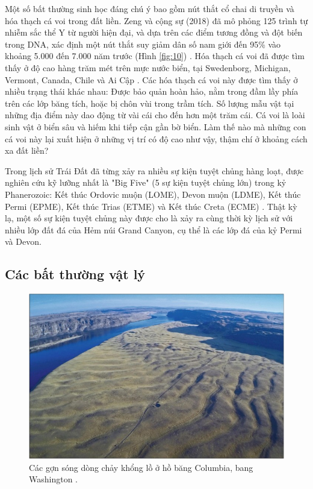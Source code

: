 \documentclass[10pt,twocolumn,letterpaper]{article}
\begin{document}
Một số bất thường sinh học đáng chú ý bao gồm nút thắt cổ chai di truyền và hóa thạch cá voi trong đất liền. Zeng và cộng sự (2018) đã mô phỏng 125 trình tự nhiễm sắc thể Y từ người hiện đại, và dựa trên các điểm tương đồng và đột biến trong DNA, xác định một nút thắt suy giảm dân số nam giới đến 95\% vào khoảng 5.000 đến 7.000 năm trước (Hình \ref{fig:10}) \cite{62}. Hóa thạch cá voi đã được tìm thấy ở độ cao hàng trăm mét trên mực nước biển, tại Swedenborg, Michigan, Vermont, Canada, Chile và Ai Cập \cite{63,64,65,66}. Các hóa thạch cá voi này được tìm thấy ở nhiều trạng thái khác nhau: Được bảo quản hoàn hảo, nằm trong đầm lầy phía trên các lớp băng tích, hoặc bị chôn vùi trong trầm tích. Số lượng mẫu vật tại những địa điểm này dao động từ vài cái cho đến hơn một trăm cái. Cá voi là loài sinh vật ở biển sâu và hiếm khi tiếp cận gần bờ biển. Làm thế nào mà những con cá voi này lại xuất hiện ở những vị trí có độ cao như vậy, thậm chí ở khoảng cách xa đất liền?

Trong lịch sử Trái Đất đã từng xảy ra nhiều sự kiện tuyệt chủng hàng loạt, được nghiên cứu kỹ lưỡng nhất là "Big Five" (5 sự kiện tuyệt chủng lớn) trong kỷ Phanerozoic: Kết thúc Ordovic muộn (LOME), Devon muộn (LDME), Kết thúc Permi (EPME), Kết thúc Trias (ETME) và Kết thúc Creta (ECME) \cite{88,89}. Thật kỳ lạ, một số sự kiện tuyệt chủng này được cho là xảy ra cùng thời kỳ lịch sử với nhiều lớp đất đá của Hẻm núi Grand Canyon, cụ thể là các lớp đá của kỷ Permi và Devon.

\subsection{Các bất thường vật lý}

\begin{figure}[b]
\begin{center}
   \includegraphics[width=1\linewidth]{columbia.jpg}
\end{center}
   \caption{Các gợn sóng dòng chảy khổng lồ ở hồ băng Columbia, bang Washington \cite{80}.}
\label{fig:11}
\label{fig:onecol}
\end{figure}
\end{document}
